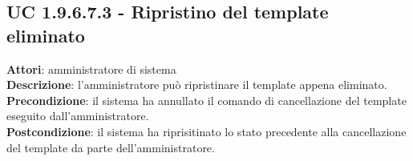 \subsection{UC 1.9.6.7.3 - Ripristino del template eliminato}{
	\label{uc1.9.6.7.3}
	\textbf{Attori}: amministratore di sistema \\
	\textbf{Descrizione}: l'amministratore può ripristinare il template appena eliminato. \\
	\textbf{Precondizione}: il sistema ha annullato il comando di cancellazione del template eseguito dall'amministratore.	\\
	\textbf{Postcondizione}: il sistema ha riprisitinato lo stato precedente alla cancellazione del template da parte dell'amministratore.	\\
	}